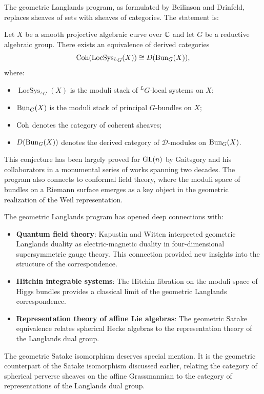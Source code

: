 The geometric Langlands program, as formulated by Beilinson and Drinfeld, replaces sheaves of sets with sheaves of categories. The statement is:

\begin{conjecture}
Let \(X\) be a smooth projective algebraic curve over \(\mathbb{C}\) and let \(G\) be a reductive algebraic group. There exists an equivalence of derived categories
\[
\operatorname{Coh}(\operatorname{LocSys}_{{}^L G}(X)) \cong D(\operatorname{Bun}_G(X)),
\]
where:
\begin{itemize}
\item \(\operatorname{LocSys}_{{}^L G}(X)\) is the moduli stack of \({}^L G\)-local systems on \(X\);
\item \(\operatorname{Bun}_G(X)\) is the moduli stack of principal \(G\)-bundles on \(X\);
\item \(\operatorname{Coh}\) denotes the category of coherent sheaves;
\item \(D(\operatorname{Bun}_G(X))\) denotes the derived category of \(\mathcal{D}\)-modules on \(\operatorname{Bun}_G(X)\).
\end{itemize}
\end{conjecture}

This conjecture has been largely proved for \(\operatorname{GL}(n)\) by Gaitsgory and his collaborators in a monumental series of works spanning two decades. The program also connects to conformal field theory, where the moduli space of bundles on a Riemann surface emerges as a key object in the geometric realization of the Weil representation.

The geometric Langlands program has opened deep connections with:
\begin{itemize}
\item \textbf{Quantum field theory}: Kapustin and Witten interpreted geometric Langlands duality as electric-magnetic duality in four-dimensional supersymmetric gauge theory. This connection provided new insights into the structure of the correspondence.
\item \textbf{Hitchin integrable systems}: The Hitchin fibration on the moduli space of Higgs bundles provides a classical limit of the geometric Langlands correspondence.
\item \textbf{Representation theory of affine Lie algebras}: The geometric Satake equivalence relates spherical Hecke algebras to the representation theory of the Langlands dual group.
\end{itemize}

The geometric Satake isomorphism deserves special mention. It is the geometric counterpart of the Satake isomorphism discussed earlier, relating the category of spherical perverse sheaves on the affine Grassmannian to the category of representations of the Langlands dual group.

